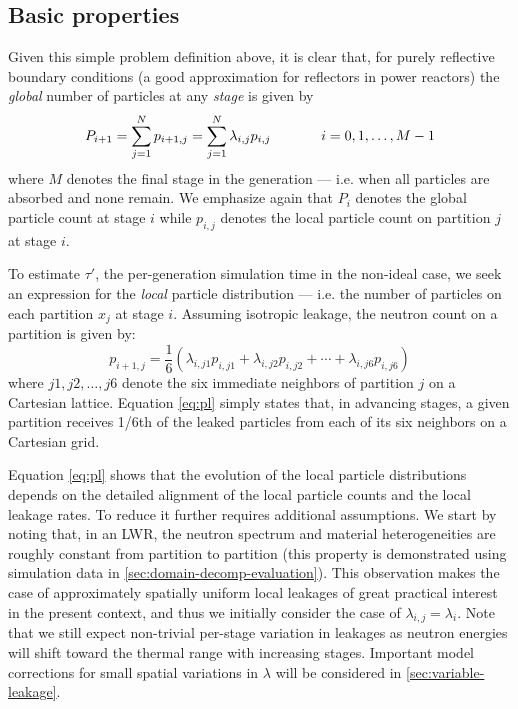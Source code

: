 \subsection{Basic properties}

Given this simple problem definition above, it is clear that, for purely
reflective boundary conditions (a good approximation for reflectors in power
reactors) the \emph{global} number of particles at any \emph{stage} is given by
\begin{equation}
  \label{eq:pg}
  P_{i+1} = \sum_{j=1}^N p_{i+1,j} = \sum_{j=1}^N \lambda_{i,j}
  p_{i,j} \hspace{.5in} i=0,1,\dotsc,M-1
\end{equation}
where $M$ denotes the final stage in the generation --- i.e. when all particles
are absorbed and none remain. We emphasize again that $P_i$ denotes the global
particle count at stage $i$ while $p_{i,j}$ denotes the local particle count on
partition $j$ at stage $i$.

To estimate $\tau'$, the per-generation simulation time in the non-ideal case,
we seek an expression for the \emph{local} particle distribution --- i.e. the
number of particles on each partition $x_j$ at stage $i$. Assuming isotropic
leakage, the neutron count on a partition is given by:
\begin{equation}
  \label{eq:pl}
  p_{i+1,j} = \frac{1}{6} \left( \lambda_{i,j1}p_{i,j1} + \lambda_{i,j2}p_{i,j2}
  + \dotsb + \lambda_{i,j6}p_{i,j6} \right)
\end{equation}
where $j1,j2,\dotsc,j6$ denote the six immediate neighbors of partition $j$ on a
Cartesian lattice. Equation \eqref{eq:pl} simply states that, in advancing
stages, a given partition receives 1/6th of the leaked particles from each of
its six neighbors on a Cartesian grid.

Equation \eqref{eq:pl} shows that the evolution of the local particle
distributions depends on the detailed alignment of the local particle counts and
the local leakage rates. To reduce it further requires additional
assumptions. We start by noting that, in an LWR, the neutron spectrum and
material heterogeneities are roughly constant from partition to partition (this
property is demonstrated using simulation data in
\autoref{sec:domain-decomp-evaluation}). This observation makes the case of
approximately spatially uniform local leakages of great practical interest in
the present context, and thus we initially consider the case of $\lambda_{i,j} =
\lambda_i$. Note that we still expect non-trivial per-stage variation in
leakages as neutron energies will shift toward the thermal range with increasing
stages. Important model corrections for small spatial variations in $\lambda$
will be considered in \autoref{sec:variable-leakage}.

